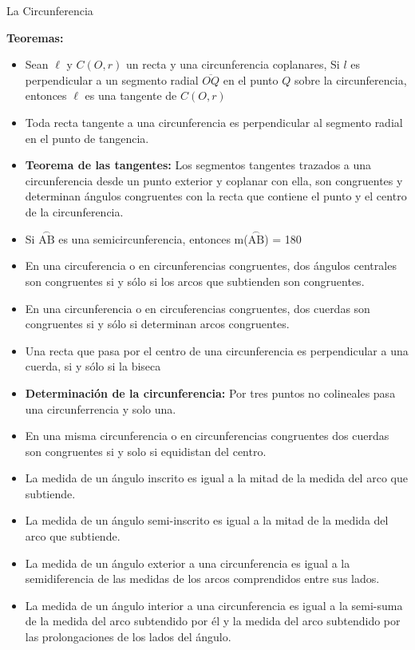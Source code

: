 \documentclass[•]{article}
\begin{document}
	\begin{center}
		\begin{huge}
			La Circunferencia
		\end{huge}
	\end{center}
	
	\begin{flushleft}
		\textbf{Teoremas:}
		\begin{itemize}
			\item Sean $\ell$ y $C(O, r)$ un recta y una circunferencia coplanares, Si $l$ es perpendicular a un segmento radial $\overline{OQ}$ en el punto $Q$ sobre la circunferencia, entonces $\ell$ es una tangente de $C(O, r)$
			\item Toda recta tangente a una circunferencia es perpendicular al segmento radial en el punto de tangencia.
			\item \textbf{Teorema de las tangentes: }Los segmentos tangentes trazados a una circunferencia desde un punto exterior y coplanar con ella, son congruentes y determinan \'angulos congruentes con la recta que contiene el punto y el centro de la circunferencia.
			\item Si $\stackrel{\textstyle\frown}{\mathrm{AB}}$ es una semicircunferencia, entonces m($\stackrel{\textstyle\frown}{\mathrm{AB}}$) = 180
			
			\item En una circuferencia o en circunferencias congruentes, dos \'angulos centrales son congruentes si y s\'olo si los arcos que subtienden son congruentes.
			\item En una circunferencia o en circuferencias congruentes, dos cuerdas son congruentes si y s\'olo si determinan arcos congruentes.
			\item Una recta que pasa por el centro de una circunferencia es perpendicular a una cuerda, si y s\'olo si la biseca
			\item \textbf{Determinaci\'on de la circunferencia: }Por tres puntos no colineales pasa una circunferrencia y solo una.
			\item En una misma circunferencia o en circunferencias congruentes dos cuerdas son congruentes si y solo si equidistan del centro.
			\item La medida de un \'angulo inscrito es igual a la mitad de la medida del arco que subtiende.
			\item La medida de un \'angulo semi-inscrito es igual a la mitad de la medida del arco que subtiende.
			\item La medida de un \'angulo exterior a una circunferencia es igual a la semidiferencia de las medidas de los arcos comprendidos entre sus lados.
			\item La medida de un \'angulo interior a una circunferencia es igual a la semi-suma de la medida del arco subtendido por \'el y la medida del arco subtendido por las prolongaciones de los lados del \'angulo.
			

\end{itemize}
\end{flushleft}
\end{document}

